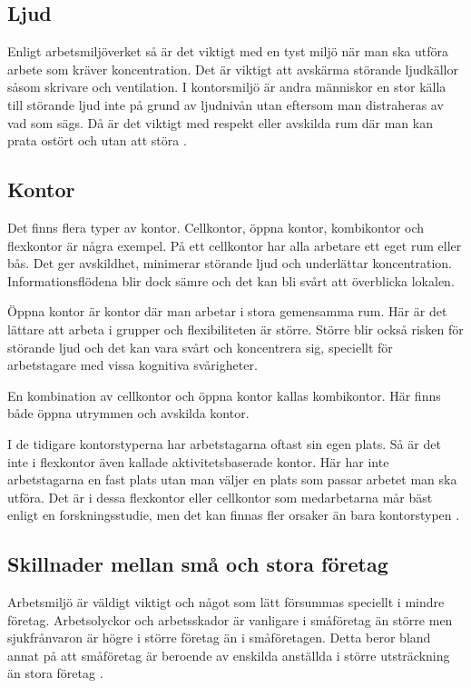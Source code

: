 \subsection{Ljud}
Enligt arbetsmiljöverket så är det viktigt med en tyst miljö när man ska utföra arbete som kräver koncentration. Det är viktigt att avskärma störande ljudkällor såsom skrivare och ventilation. I kontorsmiljö är andra människor en stor källa till störande ljud inte på grund av ljudnivån utan eftersom man distraheras av vad som sägs. Då är det viktigt med respekt eller avskilda rum där man kan prata ostört och utan att störa \cite{AVLjud}.

\subsection{Kontor}
Det finns flera typer av kontor. Cellkontor, öppna kontor, kombikontor och flexkontor är några exempel. På ett cellkontor har alla arbetare ett eget rum eller bås. Det ger avskildhet, minimerar störande ljud och underlättar koncentration. Informationsflödena blir dock sämre och det kan bli svårt att överblicka lokalen.

Öppna kontor är kontor där man arbetar i stora gemensamma rum. Här är det lättare att arbeta i grupper och flexibiliteten är större. Större blir också risken för störande ljud och det kan vara svårt och koncentrera sig, speciellt för arbetstagare med vissa kognitiva svårigheter.

En kombination av cellkontor och öppna kontor kallas kombikontor. Här finns både öppna utrymmen och avskilda kontor.

I de tidigare kontorstyperna har arbetstagarna oftast sin egen plats. Så är det inte i flexkontor även kallade aktivitetsbaserade kontor. Här har inte arbetstagarna en fast plats utan man väljer en plats som passar arbetet man ska utföra. Det är i dessa flexkontor eller cellkontor som medarbetarna mår bäst enligt en forskningsstudie, men det kan finnas fler orsaker än bara kontorstypen \cite{AVKontor}.

\subsection{Skillnader mellan små och stora företag}
Arbetsmiljö är väldigt viktigt och något som lätt försummas speciellt i mindre företag. Arbetsolyckor och arbetsskador är vanligare i småföretag än större men sjukfrånvaron är högre i större företag än i småföretagen. Detta beror bland annat på att småföretag är beroende av enskilda anställda i större utsträckning än stora företag \cite{smaforetag}.


